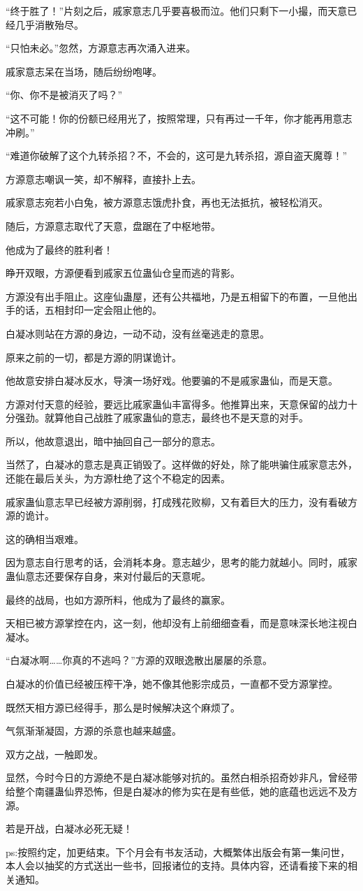 \begin{this_body}
“终于胜了！”片刻之后，戚家意志几乎要喜极而泣。他们只剩下一小撮，而天意已经几乎消散殆尽。

“只怕未必。”忽然，方源意志再次涌入进来。

戚家意志呆在当场，随后纷纷咆哮。

“你、你不是被消灭了吗？”

“这不可能！你的份额已经用光了，按照常理，只有再过一千年，你才能再用意志冲刷。”

“难道你破解了这个九转杀招？不，不会的，这可是九转杀招，源自盗天魔尊！”

方源意志嘲讽一笑，却不解释，直接扑上去。

戚家意志宛若小白兔，被方源意志饿虎扑食，再也无法抵抗，被轻松消灭。

随后，方源意志取代了天意，盘踞在了中枢地带。

他成为了最终的胜利者！

睁开双眼，方源便看到戚家五位蛊仙仓皇而逃的背影。

方源没有出手阻止。这座仙蛊屋，还有公共福地，乃是五相留下的布置，一旦他出手的话，五相封印一定会阻止他的。

白凝冰则站在方源的身边，一动不动，没有丝毫逃走的意思。

原来之前的一切，都是方源的阴谋诡计。

他故意安排白凝冰反水，导演一场好戏。他要骗的不是戚家蛊仙，而是天意。

方源对付天意的经验，要远比戚家蛊仙丰富得多。他推算出来，天意保留的战力十分强劲。就算他自己战胜了戚家蛊仙的意志，最终也不是天意的对手。

所以，他故意退出，暗中抽回自己一部分的意志。

当然了，白凝冰的意志是真正销毁了。这样做的好处，除了能哄骗住戚家意志外，还能在最后关头，为方源杜绝了这个不稳定的因素。

戚家蛊仙意志早已经被方源削弱，打成残花败柳，又有着巨大的压力，没有看破方源的诡计。

这的确相当艰难。

因为意志自行思考的话，会消耗本身。意志越少，思考的能力就越小。同时，戚家蛊仙意志还要保存自身，来对付最后的天意呢。

最终的战局，也如方源所料，他成为了最终的赢家。

天相已被方源掌控在内，这一刻，他却没有上前细细查看，而是意味深长地注视白凝冰。

“白凝冰啊……你真的不逃吗？”方源的双眼逸散出屡屡的杀意。

白凝冰的价值已经被压榨干净，她不像其他影宗成员，一直都不受方源掌控。

既然天相方源已经得手，那么是时候解决这个麻烦了。

气氛渐渐凝固，方源的杀意也越来越盛。

双方之战，一触即发。

显然，今时今日的方源绝不是白凝冰能够对抗的。虽然白相杀招奇妙非凡，曾经带给整个南疆蛊仙界恐怖，但是白凝冰的修为实在是有些低，她的底蕴也远远不及方源。

若是开战，白凝冰必死无疑！

ps:按照约定，加更结束。下个月会有书友活动，大概繁体出版会有第一集问世，本人会以抽奖的方式送出一些书，回报诸位的支持。具体内容，还请看接下来的相关通知。

\end{this_body}


